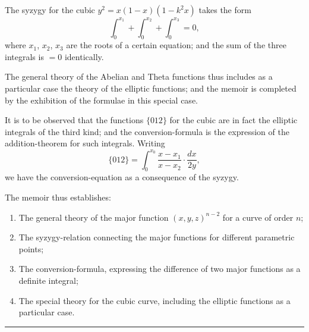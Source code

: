 \documentclass[11pt,a4paper]{book}
\begin{document}
\newpage
\begin{art}\label{art:127}
The syzygy for the cubic $y^2 = x(1-x)(1-k^2x)$ takes the form
\[
\int_0^{x_1} + \int_0^{x_2} + \int_0^{x_3} = 0,
\]
where $x_1$, $x_2$, $x_3$ are the roots of a certain equation; and the sum of the three integrals is $= 0$ identically.
\end{art}

\begin{art}\label{art:128}
The general theory of the Abelian and Theta functions thus includes as a particular case the theory of the elliptic functions; and the memoir is completed by the exhibition of the formulae in this special case.
\end{art}

\begin{art}\label{art:129}
It is to be observed that the functions $\{012\}$ for the cubic are in fact the elliptic integrals of the third kind; and the conversion-formula is the expression of the addition-theorem for such integrals. Writing
\[
\{012\} = \int_0^{x_0} \frac{x - x_1}{x - x_2} \cdot \frac{dx}{2y},
\]
we have the conversion-equation as a consequence of the syzygy.
\end{art}

\begin{art}\label{art:130}
The memoir thus establishes:
\begin{enumerate}
\item The general theory of the major function $(x, y, z)^{n-2}$ for a curve of order $n$;
\item The syzygy-relation connecting the major functions for different parametric points;
\item The conversion-formula, expressing the difference of two major functions as a definite integral;
\item The special theory for the cubic curve, including the elliptic functions as a particular case.
\end{enumerate}
\end{art}

\vspace{1cm}
\begin{center}
\rule{0.5\textwidth}{0.4pt}
\end{center}
\clearpage


\thispagestyle{empty}
\end{document}
